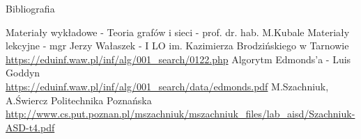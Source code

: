 \documentclass[polish,envcountsect,10pt]{beamer}
\begin{document}
\begin{frame}{Bibliografia}
    \begin{thebibliography}{99}
             Materiały wykładowe - Teoria grafów i sieci - prof. dr. hab. M.Kubale
             Materiały lekcyjne - mgr Jerzy Wałaszek - I LO im. Kazimierza Brodzińskiego w Tarnowie \\\url{https://eduinf.waw.pl/inf/alg/001_search/0122.php}
             Algorytm Edmonds'a - Luis Goddyn \\\url{https://eduinf.waw.pl/inf/alg/001_search/data/edmonds.pdf}
             M.Szachniuk, A.Świercz Politechnika Poznańska \\\url{http://www.cs.put.poznan.pl/mszachniuk/mszachniuk_files/lab_aisd/Szachniuk-ASD-t4.pdf}
    \end{thebibliography}
\end{frame}
\end{document}
